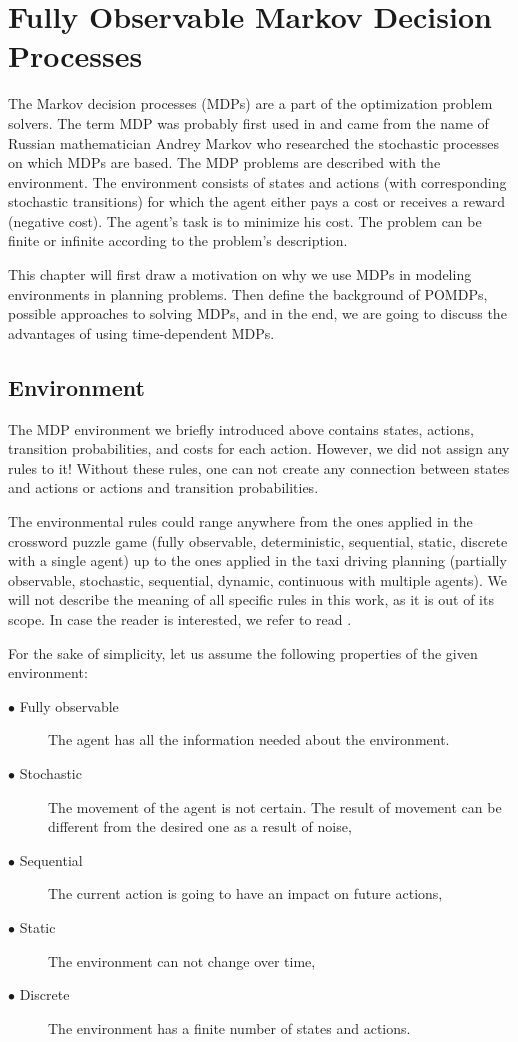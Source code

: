 




\chapter{Fully Observable Markov Decision Processes}

The Markov decision processes (MDPs) are a part of the optimization problem solvers. The term MDP was probably first used in \cite{cite:1} and came from the name of Russian mathematician Andrey Markov who researched the stochastic processes on which MDPs are based. The MDP problems are described with the environment. The environment consists of states and actions (with corresponding stochastic transitions) for which the agent either pays a cost or receives a reward (negative cost). The agent's task is to minimize his cost. The problem can be finite or infinite according to the problem's description.

This chapter will first draw a motivation on why we use MDPs in modeling environments in planning problems. Then define the background of POMDPs, possible approaches to solving MDPs, and in the end, we are going to discuss the advantages of using time-dependent MDPs.


\section{Environment}
The MDP environment we briefly introduced above contains states, actions, transition probabilities, and costs for each action. However, we did not assign any rules to it! 
Without these rules, one can not create any connection between states and actions or actions and transition probabilities.

The environmental rules could range anywhere from the ones applied in the crossword puzzle game (fully observable, deterministic, sequential, static, discrete with a single agent) up to the ones applied in the taxi driving planning (partially observable, stochastic, sequential, dynamic, continuous with multiple agents). We will not describe the meaning of all specific rules in this work, as it is out of its scope. In case the reader is interested, we refer to read  \cite{russel2010}.


For the sake of simplicity, let us assume the following properties of the given environment:
\begin{description}


  \item[$\bullet$ Fully observable] The agent has all the information needed about the environment.
  \item[$\bullet$ Stochastic] The movement of the agent is not certain. The result of movement can be different from the desired one as a result of noise,
  \item[$\bullet$ Sequential] The current action is going to have an impact on future actions,
  \item[$\bullet$ Static] The environment can not change over time,
  \item[$\bullet$ Discrete] The environment has a finite number of states and actions.
\end{description}



